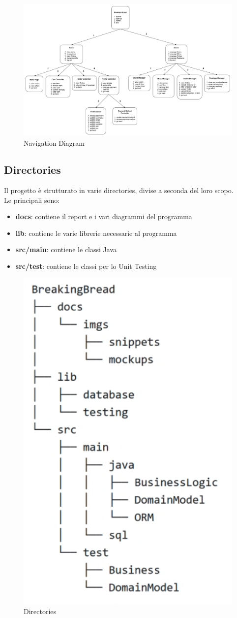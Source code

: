 \documentclass{article}
\begin{document}
\begin{figure}[h]
    \includegraphics[width=1.0\linewidth]{imgs/NavigationDiagram.png}
    \caption{Navigation Diagram}
    \label{navigationDiagram}
\end{figure}

\newpage

\subsection{Directories}
Il progetto è strutturato in varie directories, divise a seconda del loro scopo. \\
Le principali sono:
\begin{itemize}
    \item {\textbf{docs}}: contiene il report e i vari diagrammi del programma
    \item {\textbf{lib}}: contiene le varie librerie necessarie al programma
    \item {\textbf{src/main}}: contiene le classi Java
    \item {\textbf{src/test}}: contiene le classi per lo Unit Testing
\end{itemize}

\begin{figure}[!h]
    \includegraphics[width=0.5\linewidth]{imgs/Directories.png}
    \centering
    \caption{Directories}
    \label{Directories}
\end{figure}
\end{document}
